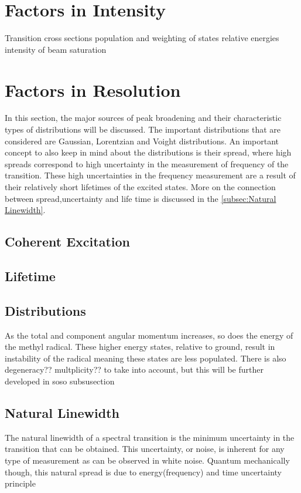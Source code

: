 \documentclass[11pt,a4paper]{book}
\begin{document}
\section{Factors in Intensity}
\label{sec:Factors in Intensity}
Transition cross sections
population and weighting of states
relative energies
intensity of beam
saturation

\section{Factors in Resolution}
\label{sec:Factors in Resolution}
In this section, the major sources of peak broadening and their characteristic types of distributions will be discussed. The important distributions that are considered are Gaussian, Lorentzian and Voight distributions. An important concept to also keep in mind about the distributions is their spread, where high spreads correspond to high uncertainty in the measurement of frequency of the transition. These high uncertainties in the frequency measurement are a result of their relatively short lifetimes of the excited states. More on the connection between spread,uncertainty and life time is discussed in the \autoref{subsec:Natural Linewidth}.
\subsection{Coherent Excitation}
\subsection{Lifetime}
\subsection{Distributions}
\label{subsec:Distributions}
As the total and component angular momentum increases, so does the energy of the methyl radical. These higher energy states, relative to ground, result in instability of the radical meaning these states are less populated. There is also degeneracy?? multplicity?? to take into account, but this will be further developed in soso subsusection \todo{}\
\subsection{Natural Linewidth}
\label{subsec:Natural Linewidth}
The natural linewidth of a spectral transition is the minimum uncertainty in the transition that can be obtained. This uncertainty, or noise, is inherent for any type of measurement as can be observed in white noise. Quantum mechanically though, this natural spread is due to energy(frequency) and time uncertainty principle
\end{document}
